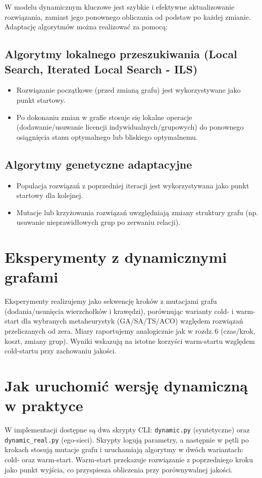 W modelu dynamicznym kluczowe jest szybkie i efektywne aktualizowanie rozwiązania, zamiast jego ponownego obliczania od podstaw po każdej zmianie. Adaptację algorytmów można realizować za pomocą:

\subsection{Algorytmy lokalnego przeszukiwania (Local Search, Iterated Local Search - ILS)}

\begin{itemize}
    \item Rozwiązanie początkowe (przed zmianą grafu) jest wykorzystywane jako punkt startowy.
    \item Po dokonaniu zmian w grafie stosuje się lokalne operacje (dodawanie/usuwanie licencji indywidualnych/grupowych) do ponownego osiągnięcia stanu optymalnego lub bliskiego optymalnemu.
\end{itemize}

\subsection{Algorytmy genetyczne adaptacyjne}

\begin{itemize}
    \item Populacja rozwiązań z poprzedniej iteracji jest wykorzystywana jako punkt startowy dla kolejnej.
    \item Mutacje lub krzyżowania rozwiązań uwzględniają zmiany struktury grafu (np. usuwanie nieprawidłowych grup po zerwaniu relacji).
\end{itemize}


\section{Eksperymenty z dynamicznymi grafami}

Eksperymenty realizujemy jako sekwencję kroków z mutacjami grafu (dodania/usunięcia wierzchołków i krawędzi), porównując warianty cold- i warm-start dla wybranych metaheurystyk (GA/SA/TS/ACO) względem rozwiązań przeliczanych od zera. Miary raportujemy analogicznie jak w rozdz.\,6 (czas/krok, koszt, zmiany grup). Wyniki wskazują na istotne korzyści warm-startu względem cold-startu przy zachowaniu jakości.

\section{Jak uruchomić wersję dynamiczną w praktyce}
W implementacji dostępne są dwa skrypty CLI: \texttt{dynamic.py} (syntetyczne) oraz \texttt{dynamic\_real.py} (ego-sieci). Skrypty logują parametry, a następnie w pętli po krokach stosują mutacje grafu i uruchamiają algorytmy w dwóch wariantach: cold- oraz warm-start. Warm-start przekazuje rozwiązanie z poprzedniego kroku jako punkt wyjścia, co przyspiesza obliczenia przy porównywalnej jakości.

